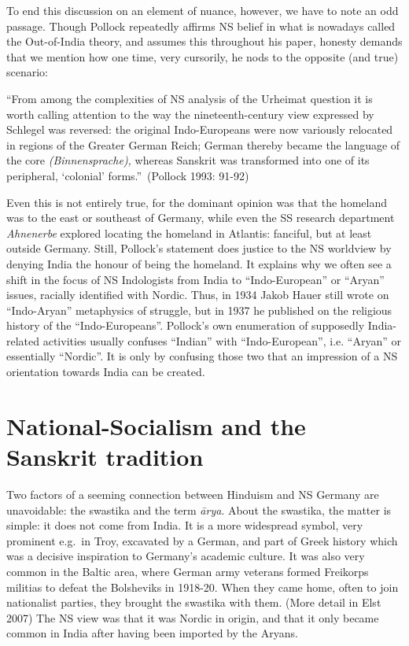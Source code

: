 To end this discussion on an element of nuance, however, we have to note an odd passage.
Though Pollock repeatedly affirms NS belief in what is nowadays called the Out-of-India theory, and assumes this throughout his paper, honesty demands that we mention how one time, very cursorily, he nods to the opposite (and true) scenario: 
\begin{myquote}
“From among the complexities of NS analysis of the Urheimat question it is worth calling attention to the way the nineteenth-century view expressed by Schlegel was reversed: the original Indo-Europeans were now variously relocated in regions of the Greater German Reich; German thereby became the language of the core {\sl (Binnensprache),} whereas Sanskrit was transformed into one of its peripheral, ‘colonial’ forms.”~\hfill(Pollock 1993: 91-92)
\end{myquote}

Even this is not entirely true, for the dominant opinion was that the homeland was to the east or southeast of Germany, while even the SS research department {\sl Ahnenerbe} explored locating the homeland in Atlantis: fanciful, but at least outside Germany. Still, Pollock’s statement does justice to the NS worldview by denying India the honour of being the homeland. It explains why we often see a shift in the focus of NS Indologists from India to “Indo-European” or “Aryan” issues, racially identified with Nordic. Thus, in 1934 Jakob Hauer still wrote on “Indo-Aryan” metaphysics of struggle, but in 1937 he published on the religious history of the “Indo-Europeans”. Pollock’s own enumeration of supposedly India-related activities usually confuses “Indian” with “Indo-European”, i.e. “Aryan” or essentially “Nordic”. It is only by confusing those two that an impression of a NS orientation towards India can be created.

\section*{National-Socialism and the Sanskrit tradition}

Two factors of a seeming connection between Hinduism and NS Germany are unavoidable: the swastika and the term {\sl ārya}. About the swastika, the matter is simple: it does not come from India. It is a more widespread symbol, very prominent e.g.\ in Troy, excavated by a German, and part of Greek history which was a decisive inspiration to Germany’s academic culture. It was also very common in the Baltic area, where German army veterans formed Freikorps militias to defeat the Bolsheviks in 1918-20. When they came home, often to join nationalist parties, they brought the swastika with them.  (More detail in Elst 2007) The NS view was that it was Nordic in origin, and that it only became common in India after having been imported by the Aryans.

